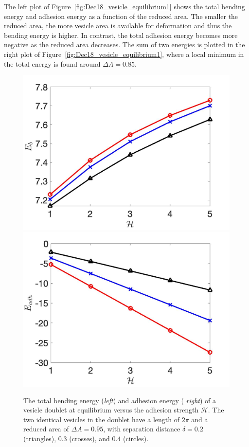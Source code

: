 \documentclass[prf,superscriptaddress,showpacs]{revtex4-1}
\begin{document}
The left plot of Figure~\ref{fig:Dec18_vesicle_equilibrium1} shows the
total bending energy and adhesion energy as a function of the reduced
area. The smaller the reduced area, the more vesicle area is available
for deformation and thus the bending energy is higher.  In contrast, the
total adhesion energy becomes more negative as the reduced area
decreases.  The sum of two energies is plotted in the right plot of
Figure~\ref{fig:Dec18_vesicle_equilibrium1}, where a local minimum in
the total energy is found around $\Delta A = 0.85$.

\begin{figure}
\includegraphics[keepaspectratio=true,scale=0.18]{figs/Dec18_Eb_vs_sigma_rA0p9502.jpeg}
\includegraphics[keepaspectratio=true,scale=0.18]{figs/Dec18_Eadh_vs_sigma_rA0p9502.jpeg}
  \caption{\label{fig:Dec18_equilibrium} 
  The total bending energy ({\em left}) and adhesion energy ({\em
  right}) of a vesicle doublet at equilibrium versus the adhesion
  strength $\mathcal{H}$.  The two identical vesicles in the doublet
  have a length of $2\pi$ and a reduced area of $\Delta A=0.95$, with
  separation distance $\delta = 0.2$ (triangles), $0.3$ (crosses), and
  $0.4$ (circles).}
\end{figure}
\end{document}
